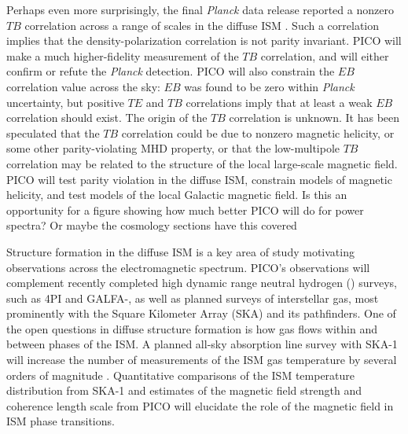 \documentclass[PICOReport.tex]{subfiles}
\begin{document}
Perhaps even more surprisingly, the final \textit{Planck} data release reported a nonzero $TB$ correlation across a range of scales in the diffuse ISM \citep{Planck2018:XI}. Such a correlation implies that the density-polarization correlation is not parity invariant. PICO will make a much higher-fidelity measurement of the $TB$ correlation, and will either confirm or refute the \textit{Planck} detection. PICO will also constrain the $EB$ correlation value across the sky: $EB$ was found to be zero within \textit{Planck} uncertainty, but positive $TE$ and $TB$ correlations imply that at least a weak $EB$ correlation should exist. The origin of the $TB$ correlation is unknown. It has been speculated that the $TB$ correlation could be due to nonzero magnetic helicity, or some other parity-violating MHD property, or that the low-multipole $TB$ correlation may be related to the structure of the local large-scale magnetic field. PICO will test parity violation in the diffuse ISM, constrain models of magnetic helicity, and test models of the local Galactic magnetic field. {\color{red} Is this an opportunity for a figure showing how much better PICO will do for power spectra? Or maybe the cosmology sections have this covered}

Structure formation in the diffuse ISM is a key area of study motivating observations across the electromagnetic spectrum. PICO's observations will complement recently completed high dynamic range neutral hydrogen (\HI) surveys, such as \HI4PI \citep{HI4PI:2016} and GALFA-\hi \citep{Peek:2018}, as well as planned surveys of interstellar gas, most prominently with the Square Kilometer Array (SKA) and its pathfinders. One of the open questions in diffuse structure formation is how gas flows within and between phases of the ISM. A planned all-sky absorption line survey with SKA-1 will increase the number of measurements of the ISM gas temperature by several orders of magnitude \citep{McClure-Griffiths2015}. Quantitative comparisons of the ISM temperature distribution from SKA-1 and estimates of the magnetic field strength and coherence length scale from PICO will elucidate the role of the magnetic field in ISM phase transitions.
\end{document}
